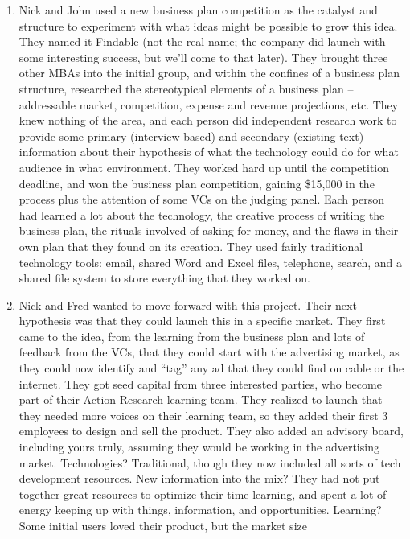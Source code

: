 \begin{enumerate}
\item
  Nick and John used a new business plan competition as the catalyst and
  structure to experiment with what ideas might be possible to grow this
  idea. They named it Findable (not the real name; the company did
  launch with some interesting success, but we'll come to that later).
  They brought three other MBAs into the initial group, and within the
  confines of a business plan structure, researched the stereotypical
  elements of a business plan -- addressable market, competition,
  expense and revenue projections, etc. They knew nothing of the area,
  and each person did independent research work to provide some primary
  (interview-based) and secondary (existing text) information about
  their hypothesis of what the technology could do for what audience in
  what environment. They worked hard up until the competition deadline,
  and won the business plan competition, gaining \$15,000 in the process
  plus the attention of some VCs on the judging panel. Each person had
  learned a lot about the technology, the creative process of writing
  the business plan, the rituals involved of asking for money, and the
  flaws in their own plan that they found on its creation. They used
  fairly traditional technology tools: email, shared Word and Excel
  files, telephone, search, and a shared file system to store everything
  that they worked on.
\item
  Nick and Fred wanted to move forward with this project. Their next
  hypothesis was that they could launch this in a specific market. They
  first came to the idea, from the learning from the business plan and
  lots of feedback from the VCs, that they could start with the
  advertising market, as they could now identify and ``tag'' any ad that
  they could find on cable or the internet. They got seed capital from
  three interested parties, who become part of their Action Research
  learning team. They realized to launch that they needed more voices on
  their learning team, so they added their first 3 employees to design
  and sell the product. They also added an advisory board, including
  yours truly, assuming they would be working in the advertising market.
  Technologies? Traditional, though they now included all sorts of tech
  development resources. New information into the mix? They had not put
  together great resources to optimize their time learning, and spent a
  lot of energy keeping up with things, information, and opportunities.
  Learning? Some initial users loved their product, but the market size

\end{enumerate}

